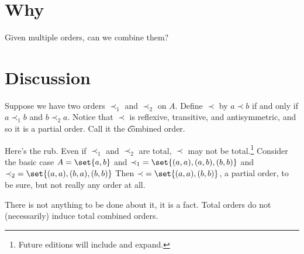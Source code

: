

\section*{Why}

Given multiple orders, can we combine them?

\section*{Discussion}

Suppose we have two orders $\prec_1$ and $\prec_2$ on $A$.
Define $\prec$ by $a \prec b$ if and only if $a \prec_1 b$ and $b \prec_2 a$.
Notice that $\prec$ is reflexive, transitive, and antisymmetric, and so it is a partial order.
Call it the \t{combined order}.

Here's the rub.
Even if $\prec_1$ and $\prec_2$ are total, $\prec$ may not be total.\footnote{Future editions will include and expand.}
Consider the basic case $A = \set{a, b}$ and $\prec_1 \; = \set{(a,a), (a, b), (b,b)}$ and $\prec_2 \; = \set{(a,a), (b,a), (b,b)}$
Then $\prec \; = \set{(a,a), (b,b)}$, a partial order, to be sure, but not really any order at all.

There is not anything to be done about it, it is a fact.
Total orders do not (necessarily) induce total combined orders.

\blankpage
